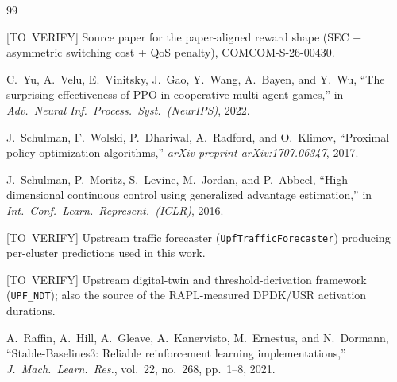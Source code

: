 \documentclass[journal]{IEEEtran}
\begin{document}
\begin{thebibliography}{99}

[TO~VERIFY] Source paper for the paper-aligned reward shape
(SEC + asymmetric switching cost + QoS penalty),
COMCOM-S-26-00430.

C.~Yu, A.~Velu, E.~Vinitsky, J.~Gao, Y.~Wang, A.~Bayen, and Y.~Wu,
``The surprising effectiveness of PPO in cooperative multi-agent
games,'' in \emph{Adv.\ Neural Inf.\ Process.\ Syst.\ (NeurIPS)},
2022.

J.~Schulman, F.~Wolski, P.~Dhariwal, A.~Radford, and O.~Klimov,
``Proximal policy optimization algorithms,'' \emph{arXiv preprint
arXiv:1707.06347}, 2017.

J.~Schulman, P.~Moritz, S.~Levine, M.~Jordan, and P.~Abbeel,
``High-dimensional continuous control using generalized advantage
estimation,'' in \emph{Int.\ Conf.\ Learn.\ Represent.\ (ICLR)},
2016.

[TO~VERIFY] Upstream traffic forecaster (\texttt{UpfTrafficForecaster})
producing per-cluster predictions used in this work.

[TO~VERIFY] Upstream digital-twin and threshold-derivation framework
(\texttt{UPF\_NDT}); also the source of the RAPL-measured DPDK/USR
activation durations.

A.~Raffin, A.~Hill, A.~Gleave, A.~Kanervisto, M.~Ernestus, and
N.~Dormann, ``Stable-Baselines3: Reliable reinforcement learning
implementations,'' \emph{J.\ Mach.\ Learn.\ Res.}, vol.~22,
no.~268, pp.~1--8, 2021.

\end{thebibliography}
\end{document}
